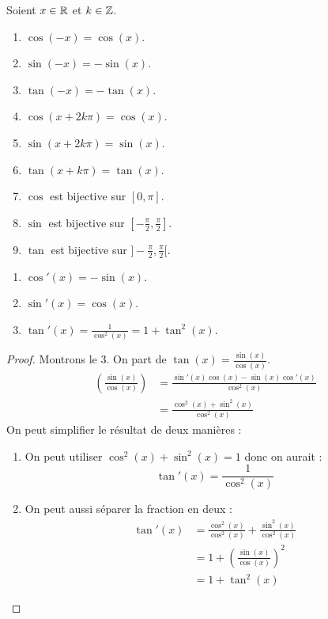 \begin{proposition}
	Soient $x \in \mathbb{R}$ et $k \in \mathbb{Z}$.
	\begin{enumerate}
		\item $\cos(-x) = \cos(x)$.
		\item $\sin(-x) = -\sin(x)$.
		\item $\tan(-x) = -\tan(x)$.
		\item $\cos(x + 2k\pi) = \cos(x)$.
		\item $\sin(x + 2k\pi) = \sin(x)$.
		\item $\tan(x + k\pi) = \tan(x)$.
		\item $\cos$ est bijective sur $[0, \pi]$.
		\item $\sin$ est bijective sur $[-\frac{\pi}{2}, \frac{\pi}{2}]$.
		\item $\tan$ est bijective sur $]-\frac{\pi}{2}, \frac{\pi}{2}[$.
	\end{enumerate}
\end{proposition}

\begin{proposition}
	\begin{enumerate}
		\item $\cos'(x) = -\sin(x)$. 
		\item $\sin'(x) = \cos(x)$.
		\item $\tan'(x) = \frac{1}{\cos^2(x)} = 1 + \tan^2(x)$.
	\end{enumerate}
\end{proposition}

\begin{proof}
	Montrons le 3.
	On part de $\tan(x) = \frac{\sin(x)}{\cos(x)}$.
	\begin{align*}
		\left( \frac{\sin(x)}{\cos(x)} \right) &= \frac{\sin'(x) \cos(x) - \sin(x) \cos'(x)}{\cos^2(x)} \\
		&= \frac{\cos^2(x) + \sin^2(x)}{\cos^2(x)}
	\end{align*}
	On peut simplifier le résultat de deux manières :
	\begin{enumerate}
		\item On peut utiliser $\cos^2(x) + \sin^2(x) = 1$
		donc on aurait :
		\[ \tan'(x) = \frac{1}{\cos^2(x)} \]
		\item On peut aussi séparer la fraction en deux :
		\begin{align*}
			\tan'(x) &= \frac{\cos^2(x)}{\cos^2(x)} + \frac{\sin^2(x)}{\cos^2(x)} \\
			&= 1 + \left( \frac{\sin(x)}{\cos(x)} \right)^2 \\
			&= 1 + \tan^2(x)
		\end{align*}
	\end{enumerate}
\end{proof}

